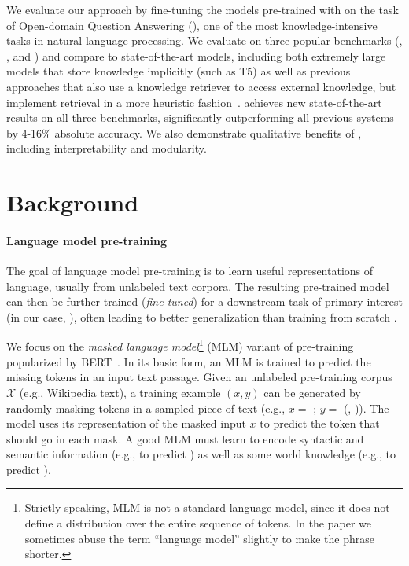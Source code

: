\documentclass{article}
\begin{document}
We evaluate our approach by fine-tuning the models pre-trained with \thename on the task of Open-domain Question Answering (\openqa), one of the most knowledge-intensive tasks in natural language processing.
We evaluate on three popular \openqa benchmarks (\nq, \wq, and \trec) and compare to state-of-the-art \openqa models, including both extremely large models that store knowledge implicitly (such as T5) as well as previous approaches that also use a knowledge retriever to access external knowledge, but implement retrieval in a more heuristic fashion~\cite{orqa,openqa_hardem,rrp_salesforce}. \thename achieves new state-of-the-art results on all three benchmarks, significantly outperforming all previous systems by 4-16\% absolute accuracy. We also demonstrate qualitative benefits of \thename, including interpretability and modularity.

 \section{Background}
\label{sec:background}
\paragraph{Language model pre-training}

The goal of language model pre-training is to learn useful representations of language,
usually from unlabeled text corpora.
The resulting pre-trained model can then be further trained (\emph{fine-tuned}) for a downstream task of primary interest (in our case, \openqa),
often leading to better generalization than training from scratch \cite{dai_finetune,gpt2}.

We focus on the {\em masked language model}\footnote{Strictly speaking, MLM is not a standard language model, since it does not define a distribution over the entire sequence of tokens. In the paper we sometimes abuse the term ``language model'' slightly to make the phrase shorter.}
(MLM) variant of pre-training popularized by BERT~\cite{bert}.
In its basic form, an MLM is trained to predict the missing tokens in an input text passage.
Given an unlabeled pre-training corpus $\mathcal{X}$ (e.g., Wikipedia text),
a training example $(x, y)$ can be generated by randomly masking tokens in a sampled piece of text
(e.g., $x =$ ; $y =$ (, )).
The model uses its representation of the masked input $x$ to predict
the token that should go in each mask.
A good MLM must learn to encode syntactic and semantic information (e.g., to predict )
as well as some world knowledge (e.g., to predict ).
\end{document}
